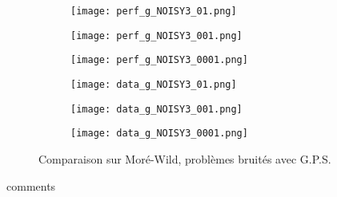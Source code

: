 \documentclass[letterpaper]{scrartcl}
\begin{document}
\begin{figure}[!htb] %
	\begin{subfigure}{0.48\textwidth}
		\texttt{[image: perf\_g\_NOISY3\_01.png]}
	\end{subfigure}\hspace*{\fill}
	\begin{subfigure}{0.48\textwidth}
		\texttt{[image: perf\_g\_NOISY3\_001.png]}
	\end{subfigure}
	\medskip
	\begin{subfigure}{0.48\textwidth}
		\texttt{[image: perf\_g\_NOISY3\_0001.png]}
	\end{subfigure}\hspace*{\fill}
	\begin{subfigure}{0.48\textwidth}
		\texttt{[image: data\_g\_NOISY3\_01.png]}
	\end{subfigure}
	\medskip
	\begin{subfigure}{0.48\textwidth}
		\texttt{[image: data\_g\_NOISY3\_001.png]}
	\end{subfigure}\hspace*{\fill}
	\begin{subfigure}{0.48\textwidth}
		\texttt{[image: data\_g\_NOISY3\_0001.png]}
	\end{subfigure}
	\caption{Comparaison sur Moré-Wild, problèmes bruités avec G.P.S.} \label{fig:7}
\end{figure}
\clearpage
comments
\clearpage
\end{document}
